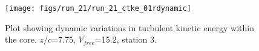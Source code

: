 \begin{figure}[H]
\centering
\texttt{[image: figs/run\_21/run\_21\_ctke\_01rdynamic]}
\caption{Plot showing dynamic variations in turbulent kinetic energy within the core. $z/c$=7.75, $V_{free}$=15.2, station 3.}
\label{fig:run_21_ctke_01rdynamic}
\end{figure}



